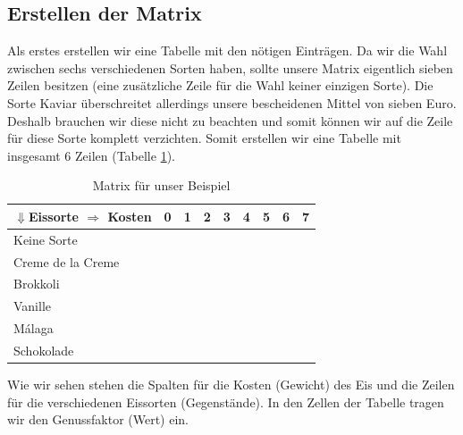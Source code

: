 \documentclass[a4paper, 12pt]{article}
\begin{document}
\subsection{Erstellen der Matrix}

Als erstes erstellen wir eine Tabelle mit den nötigen Einträgen. Da wir die Wahl zwischen sechs verschiedenen Sorten haben, sollte unsere Matrix eigentlich sieben Zeilen besitzen (eine zusätzliche Zeile für die Wahl keiner einzigen Sorte). Die Sorte Kaviar überschreitet allerdings unsere bescheidenen Mittel von sieben Euro. Deshalb brauchen wir diese nicht zu beachten und somit können wir auf die Zeile für diese Sorte komplett verzichten. Somit erstellen wir eine Tabelle mit insgesamt 6 Zeilen (Tabelle \ref{table:Leer}).

\begin{table}[H]
	\begin{center}
		\begin{tabular}{l|cccccccc}
			$\Downarrow$Eissorte $\Rightarrow$ Kosten & 0 & 1 & 2 & 3 & 4 & 5 &
			6 & 7\\
			\hline
			Keine Sorte			&	&	&	&	&	&	&	&\\
			Creme de la Creme	&	&	&	&	&	&	&	&\\
			Brokkoli			&	&	&	&	&	&	&	&\\
			Vanille				&	&	&	&	&	&	&	&\\
			Málaga				&	&	&	&	&	&	&	&\\
			Schokolade			&	&	&	&	&	&	&	&\\
		\end{tabular}
	\end{center}
\caption{Matrix für unser Beispiel}
\label{table:Leer}
\end{table}

Wie wir sehen stehen die Spalten für die Kosten (Gewicht) des Eis und die Zeilen für die verschiedenen Eissorten (Gegenstände). In den Zellen der Tabelle tragen wir den Genussfaktor (Wert) ein.
\end{document}
